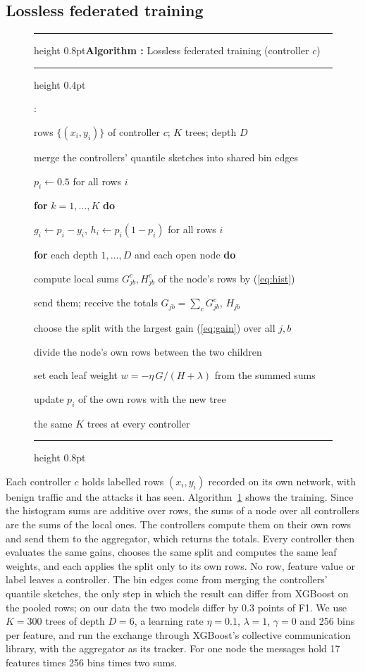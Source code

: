 \documentclass[conference]{IEEEtran}
\newcounter{algo}
\newcounter{algline}
\newcommand{\Kw}[1]{\textbf{#1}}
\newcommand{\Ind}{\hspace*{1em}}
\newenvironment{algo}[2]{\begin{figure}[t]\refstepcounter{algo}\label{#2}%
  \hrule height 0.8pt\vspace{2pt}\noindent\textbf{Algorithm \thealgo:} #1\par\vspace{2pt}%
  \hrule height 0.4pt\vspace{2pt}\footnotesize\raggedright
  \begin{list}{\arabic{algline}:}{\usecounter{algline}\setlength{\leftmargin}{1.7em}%
    \setlength{\labelwidth}{1.4em}\setlength{\itemsep}{0pt}\setlength{\parsep}{0pt}\setlength{\topsep}{0pt}}}%
  {\end{list}\vspace{2pt}\hrule height 0.8pt\end{figure}}
\begin{document}
\subsection{Lossless federated training}

\begin{algo}{Lossless federated training (controller $c$)}{alg:train}
\item[\textbf{In:}] rows $\{(x_i, y_i)\}$ of controller $c$; $K$ trees; depth $D$
\item merge the controllers' quantile sketches into shared bin edges
\item $p_i \gets 0.5$ for all rows $i$
\item \Kw{for} $k = 1, \dots, K$ \Kw{do}
\item \Ind $g_i \gets p_i - y_i$,\; $h_i \gets p_i(1 - p_i)$ for all rows $i$
\item \Ind \Kw{for} each depth $1, \dots, D$ and each open node \Kw{do}
\item \Ind\Ind compute local sums $G^{c}_{jb}, H^{c}_{jb}$ of the node's rows by (\ref{eq:hist})
\item \Ind\Ind send them; receive the totals $G_{jb} = \sum_{c} G^{c}_{jb}$, $H_{jb}$
\item \Ind\Ind choose the split with the largest gain (\ref{eq:gain}) over all $j, b$
\item \Ind\Ind divide the node's own rows between the two children
\item \Ind set each leaf weight $w = -\eta\, G/(H + \lambda)$ from the summed sums
\item \Ind update $p_i$ of the own rows with the new tree
\item[\textbf{Out:}] the same $K$ trees at every controller
\end{algo}

Each controller $c$ holds labelled rows $(x_i, y_i)$ recorded on its own network, with benign traffic and
the attacks it has seen. Algorithm~\ref{alg:train} shows the training. Since the histogram sums are
additive over rows, the sums of a node over all controllers are the sums of the local ones. The
controllers compute them on their own rows and send them to the aggregator, which returns the totals.
Every controller then evaluates the same gains, chooses the same split and computes the same leaf
weights, and each applies the split only to its own rows. No row, feature value or label leaves a
controller. The bin edges come from merging the controllers' quantile sketches, the only step in which
the result can differ from XGBoost on the pooled rows; on our data the two models differ by 0.3 points
of F1. We use $K = 300$ trees of depth $D = 6$, a learning rate $\eta = 0.1$, $\lambda = 1$,
$\gamma = 0$ and 256 bins per feature, and run the exchange through XGBoost's collective communication
library, with the aggregator as its tracker. For one node the messages hold 17 features times 256 bins
times two sums.
\end{document}

